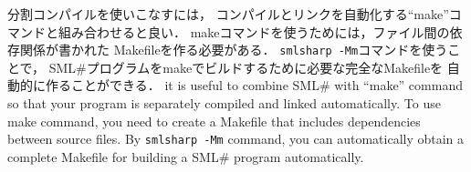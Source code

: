 \documentclass{jbook}
\newcommand{\smlsharp}{SML\#}
\begin{document}
\ifjp%
	分割コンパイルを使いこなすには，
コンパイルとリンクを自動化する``make''コマンドと組み合わせると良い．
	makeコマンドを使うためには，ファイル間の依存関係が書かれた
Makefileを作る必要がある．
	{\tt smlsharp -Mm}コマンドを使うことで，
\smlsharp{}プログラムをmakeでビルドするために必要な完全なMakefileを
自動的に作ることができる．
\else%
	it is useful to combine \smlsharp{} with ``make'' command so that
your program is separately compiled and linked automatically.
	To use make command,
you need to create a Makefile that includes dependencies between source
files.
	By {\tt smlsharp -Mm} command, you can automatically obtain
a complete Makefile for building a \smlsharp{} program automatically.
\fi%
\end{document}
